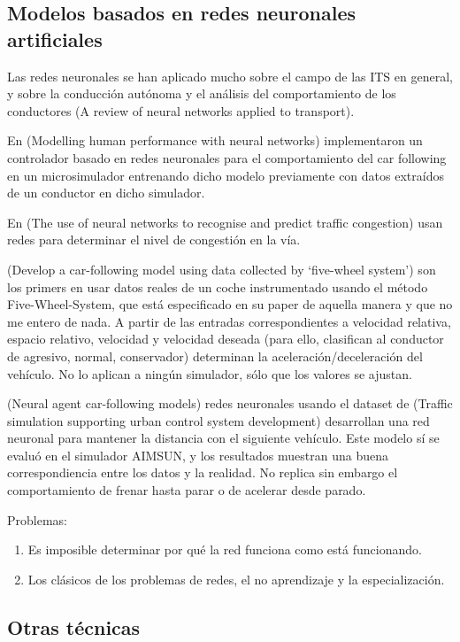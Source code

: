 \subsection{Modelos basados en redes neuronales artificiales}

Las redes neuronales se han aplicado mucho sobre el campo de las ITS en general, y sobre la conducción autónoma y el análisis del comportamiento de los conductores (A review of neural networks applied to transport).

En (Modelling human performance with neural networks) implementaron un controlador basado en redes neuronales para el comportamiento del car following en un microsimulador entrenando dicho modelo previamente con datos extraídos de un conductor en dicho simulador.

En (The  use  of  neural  networks  to  recognise  and
predict traffic congestion) usan redes para determinar el nivel de congestión en la vía.

(Develop a car-following model using data collected by ‘five-wheel
system’) son los primers en usar datos reales de un coche instrumentado usando el método Five-Wheel-System, que está especificado en su paper de aquella manera y que no me entero de nada. A partir de las entradas correspondientes a velocidad relativa, espacio relativo, velocidad y velocidad deseada (para ello, clasifican al conductor de agresivo, normal, conservador) determinan la aceleración/deceleración del vehículo. No lo aplican a ningún simulador, sólo que los valores se ajustan.

(Neural agent car-following models) redes neuronales usando el dataset de (Traffic simulation supporting urban control system development) desarrollan una red neuronal para mantener la distancia con el siguiente vehículo. Este modelo sí se evaluó en el simulador AIMSUN, y los resultados muestran una buena correspondiencia entre los datos y la realidad. No replica sin embargo el comportamiento de frenar hasta parar o de acelerar desde parado.

Problemas:

\begin{enumerate}
	\item Es imposible determinar por qué la red funciona como está funcionando.
	\item Los clásicos de los problemas de redes, el no aprendizaje y la especialización.
\end{enumerate}

\subsection{Otras técnicas}

